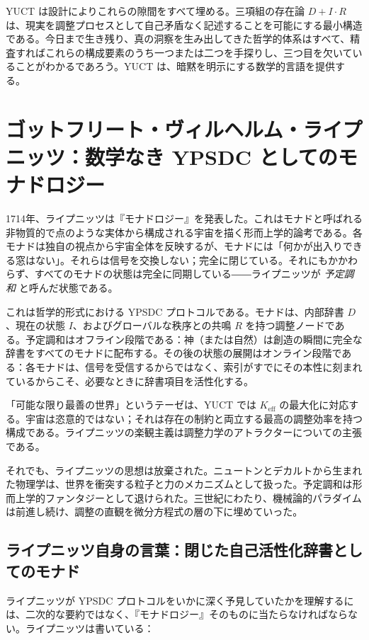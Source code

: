 \documentclass[12pt,a4paper]{article}
\begin{document}
	YUCT は設計によりこれらの隙間をすべて埋める。三項組の存在論 \(D + I \cdot R\) は、現実を調整プロセスとして自己矛盾なく記述することを可能にする最小構造である。今日まで生き残り、真の洞察を生み出してきた哲学的体系はすべて、精査すればこれらの構成要素のうち一つまたは二つを手探りし、三つ目を欠いていることがわかるであろう。YUCT は、暗黙を明示にする数学的言語を提供する。
	
	\section{ゴットフリート・ヴィルヘルム・ライプニッツ：数学なき YPSDC としてのモナドロジー}
	
	1714年、ライプニッツは『モナドロジー』を発表した。これはモナドと呼ばれる非物質的で点のような実体から構成される宇宙を描く形而上学的論考である。各モナドは独自の視点から宇宙全体を反映するが、モナドには「何かが出入りできる窓はない」\cite{Leibniz1714}。それらは信号を交換しない；完全に閉じている。それにもかかわらず、すべてのモナドの状態は完全に同期している――ライプニッツが \emph{予定調和} と呼んだ状態である。
	
	これは哲学的形式における YPSDC プロトコルである。モナドは、内部辞書 \(D\)、現在の状態 \(I\)、およびグローバルな秩序との共鳴 \(R\) を持つ調整ノードである。予定調和はオフライン段階である：神（または自然）は創造の瞬間に完全な辞書をすべてのモナドに配布する。その後の状態の展開はオンライン段階である：各モナドは、信号を受信するからではなく、索引がすでにその本性に刻まれているからこそ、必要なときに辞書項目を活性化する。
	
	「可能な限り最善の世界」というテーゼは、YUCT では \(K_{\mathrm{eff}}\) の最大化に対応する。宇宙は恣意的ではない；それは存在の制約と両立する最高の調整効率を持つ構成である。ライプニッツの楽観主義は調整力学のアトラクターについての主張である。
	
	それでも、ライプニッツの思想は放棄された。ニュートンとデカルトから生まれた物理学は、世界を衝突する粒子と力のメカニズムとして扱った。予定調和は形而上学的ファンタジーとして退けられた。三世紀にわたり、機械論的パラダイムは前進し続け、調整の直観を微分方程式の層の下に埋めていった。
	
	\subsection{ライプニッツ自身の言葉：閉じた自己活性化辞書としてのモナド}
	
	ライプニッツが YPSDC プロトコルをいかに深く予見していたかを理解するには、二次的な要約ではなく、『モナドロジー』そのものに当たらなければならない。ライプニッツは書いている：
	
\end{document}

